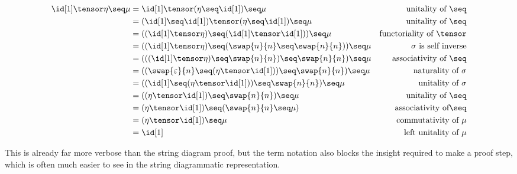 \begin{align*}
    \id[1] \tensor \eta \seq \mu
     & =
    \id[1] \tensor (\eta \seq \id[1]) \seq \mu
     &
    \text{unitality of } \seq
    \\
     & =
    (\id[1] \seq \id[1]) \tensor (\eta \seq \id[1]) \seq \mu
     &
    \text{unitality of } \seq
    \\
     & =
    ((\id[1] \tensor \eta) \seq (\id[1] \tensor \id[1])) \seq \mu
     &
    \text{functoriality of } \tensor
    \\
     & =
    ((\id[1] \tensor \eta) \seq (\swap{n}{n} \seq \swap{n}{n})) \seq \mu
     &
    \sigma \text{ is self inverse}
    \\
     & =
    (((\id[1] \tensor \eta) \seq \swap{n}{n}) \seq \swap{n}{n}) \seq \mu
     &
    \text{associativity of } \seq
    \\
     & =
    ((\swap{\varepsilon}{n} \seq (\eta \tensor \id[1])) \seq \swap{n}{n}) \seq \mu
     &
    \text{naturality of } \sigma
    \\
     & =
    ((\id[1] \seq (\eta \tensor \id[1])) \seq \swap{n}{n}) \seq \mu
     &
    \text{unitality of } \sigma
    \\
     & =
    ((\eta \tensor \id[1]) \seq \swap{n}{n}) \seq \mu
     &
    \text{unitality of } \seq
    \\
     & =
    (\eta \tensor \id[1]) \seq (\swap{n}{n} \seq \mu)
     &
    \text{associativity of} \seq
    \\
     & =
    (\eta \tensor \id[1]) \seq \mu
     &
    \text{commutativity of } \mu
    \\
     & =
    \id[1]
     &
    \text{left unitality of } \mu
\end{align*}

This is already far more verbose than the string diagram proof, but the term
notation also blocks the insight required to make a proof step, which is often
much easier to see in the string diagrammatic representation.